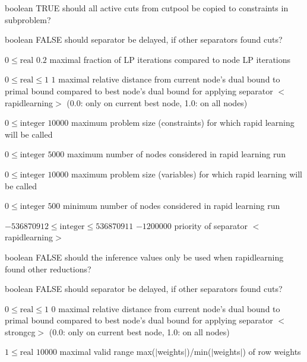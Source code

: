 %
{boolean}%
{TRUE}%
{should all active cuts from cutpool be copied to constraints in subproblem?}%
{}

%
{boolean}%
{FALSE}%
{should separator be delayed, if other separators found cuts?}%
{}

%
{$0\leq\textrm{real}$}%
{$0.2$}%
{maximal fraction of LP iterations compared to node LP iterations}%
{}

%
{$0\leq\textrm{real}\leq1$}%
{$1$}%
{maximal relative distance from current node's dual bound to primal bound compared to best node's dual bound for applying separator $<$rapidlearning$>$ (0.0: only on current best node, 1.0: on all nodes)}%
{}

%
{$0\leq\textrm{integer}$}%
{$10000$}%
{maximum problem size (constraints) for which rapid learning will be called}%
{}

%
{$0\leq\textrm{integer}$}%
{$5000$}%
{maximum number of nodes considered in rapid learning run}%
{}

%
{$0\leq\textrm{integer}$}%
{$10000$}%
{maximum problem size (variables) for which rapid learning will be called}%
{}

%
{$0\leq\textrm{integer}$}%
{$500$}%
{minimum number of nodes considered in rapid learning run}%
{}

%
{$-536870912\leq\textrm{integer}\leq536870911$}%
{$-1200000$}%
{priority of separator $<$rapidlearning$>$}%
{}

%
{boolean}%
{FALSE}%
{should the inference values only be used when rapidlearning found other reductions?}%
{}

%
{boolean}%
{FALSE}%
{should separator be delayed, if other separators found cuts?}%
{}

%
{$0\leq\textrm{real}\leq1$}%
{$0$}%
{maximal relative distance from current node's dual bound to primal bound compared to best node's dual bound for applying separator $<$strongcg$>$ (0.0: only on current best node, 1.0: on all nodes)}%
{}

%
{$1\leq\textrm{real}$}%
{$10000$}%
{maximal valid range max($|$weights$|$)/min($|$weights$|$) of row weights}%
{}

